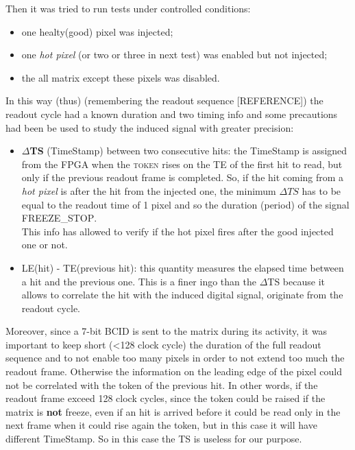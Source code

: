 Then it was tried to run tests under controlled conditions:
\begin{itemize}
\item one healty(good) pixel was injected;
\item one \textit{hot pixel} (or two or three in next test) was enabled but not injected;
\item the all matrix except these pixels was disabled.
\end{itemize}

In this way (thus) (remembering the readout sequence [REFERENCE]) the readout cycle had a known duration and two timing info and some precautions had been be used to study the induced signal with greater precision:

\begin{itemize}
\item \textbf{$\Delta$TS} (TimeStamp) between two consecutive hits: the TimeStamp is assigned from the FPGA when the \textsc{token} rises on the TE of the first hit to read, but only if the previous readout frame is completed. So, if the hit coming from a \textit{hot pixel} is after the hit from the injected one, the minimum $\Delta TS$ has to be equal to the readout time of 1 pixel and so the duration (period) of the signal \textsc{FREEZE\_STOP}.\\
This info has allowed to verify if the hot pixel fires after the good injected one or not.
\item LE(hit) - TE(previous hit): this quantity measures the elapsed time between a hit and the previous one. This is a finer ingo than the $\Delta$TS because it allows to correlate the hit with the induced digital signal, originate from the readout cycle.
\end{itemize}

Moreover, since a 7-bit BCID is sent to the matrix during its activity, it was important to keep short (<128 clock cycle) the duration of the full readout sequence and to not enable too many pixels in order to not extend too much the readout frame. Otherwise the information on the leading edge of the pixel could not be correlated with the token of the previous hit. In other words, if the readout frame exceed 128 clock cycles, since the token could be raised if the matrix is \textbf{not} freeze, even if an hit is arrived before it could be read only in the next frame when it could rise again the token, but in this case it will have different TimeStamp. So in this case the TS is useless for our purpose.


